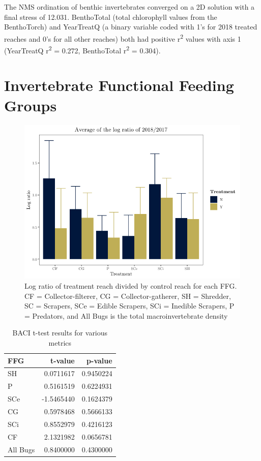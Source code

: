 \documentclass[double,12pt]{beavtex}
\begin{document}
  The NMS ordination of benthic invertebrates converged on a 2D solution
  with a final stress of 12.031. BenthoTotal (total chlorophyll values
  from the BenthoTorch) and YearTreatQ (a binary variable coded with 1's
  for 2018 treated reaches and 0's for all other reaches) both had
  positive r\textsuperscript{2} values with axis 1 (YearTreatQ
  r\textsuperscript{2} = 0.272, BenthoTotal r\textsuperscript{2} = 0.304).
  
  \section*{Invertebrate Functional Feeding
  Groups}\label{invertebrate-functional-feeding-groups}
  
  \begin{figure}
  
  {\centering \includegraphics[width=0.6\linewidth]{Figures/AvgFFGratio-1} 
  
  }
  
  \caption[Log ratio of treatment reach divided by control reach for each FFG]{Log ratio of treatment reach divided by control reach for each FFG. CF = Collector-filterer, CG = Collector-gatherer, SH = Shredder, SC = Scrapers, SCe = Edible Scrapers, SCi = Inedible Scrapers, P = Predators, and All Bugs is the total macroinvertebrate density}\label{fig:unnamed-chunk-3}
  \end{figure}
  
  \begin{table}[t]
  
  \caption{\label{tab:ffgtable}BACI t-test results for various metrics}
  \centering
  \begin{tabular}{lrr}
  \toprule
  FFG & t-value & p-value\\
  \midrule
  SH & 0.0711617 & 0.9450224\\
  P & 0.5161519 & 0.6224931\\
  SCe & -1.5465440 & 0.1624379\\
  CG & 0.5978468 & 0.5666133\\
  SCi & 0.8552979 & 0.4216123\\
  \addlinespace
  CF & 2.1321982 & 0.0656781\\
  All Bugs & 0.8400000 & 0.4300000\\
  \bottomrule
  \end{tabular}
  \end{table}
  
\end{document}
